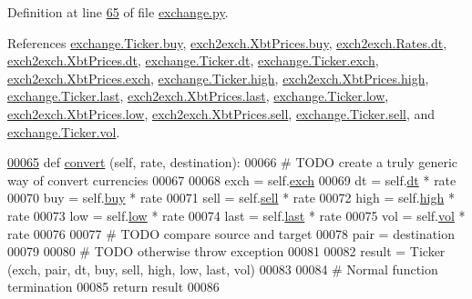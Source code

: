 Definition at line \hyperlink{exchange_8py_source_l00065}{65} of file \hyperlink{exchange_8py_source}{exchange.\+py}.



References \hyperlink{exchange_8py_source_l00058}{exchange.\+Ticker.\+buy}, \hyperlink{exch2exch_8py_source_l00059}{exch2exch.\+Xbt\+Prices.\+buy}, \hyperlink{exch2exch_8py_source_l00028}{exch2exch.\+Rates.\+dt}, \hyperlink{exch2exch_8py_source_l00057}{exch2exch.\+Xbt\+Prices.\+dt}, \hyperlink{exchange_8py_source_l00057}{exchange.\+Ticker.\+dt}, \hyperlink{exchange_8py_source_l00055}{exchange.\+Ticker.\+exch}, \hyperlink{exch2exch_8py_source_l00064}{exch2exch.\+Xbt\+Prices.\+exch}, \hyperlink{exchange_8py_source_l00060}{exchange.\+Ticker.\+high}, \hyperlink{exch2exch_8py_source_l00061}{exch2exch.\+Xbt\+Prices.\+high}, \hyperlink{exchange_8py_source_l00062}{exchange.\+Ticker.\+last}, \hyperlink{exch2exch_8py_source_l00063}{exch2exch.\+Xbt\+Prices.\+last}, \hyperlink{exchange_8py_source_l00061}{exchange.\+Ticker.\+low}, \hyperlink{exch2exch_8py_source_l00062}{exch2exch.\+Xbt\+Prices.\+low}, \hyperlink{exch2exch_8py_source_l00058}{exch2exch.\+Xbt\+Prices.\+sell}, \hyperlink{exchange_8py_source_l00059}{exchange.\+Ticker.\+sell}, and \hyperlink{exchange_8py_source_l00063}{exchange.\+Ticker.\+vol}.


\begin{DoxyCode}
\hypertarget{classexchange_1_1_ticker.tex_l00065}{}\hyperlink{classexchange_1_1_ticker_a2aa851437f953462f8e8bce7ca05c3ec}{00065}     \textcolor{keyword}{def }\hyperlink{classexchange_1_1_ticker_a2aa851437f953462f8e8bce7ca05c3ec}{convert} (self, rate, destination):
00066         \textcolor{comment}{# TODO create a truly generic way of convert currencies}
00067     
00068         exch = self.\hyperlink{classexchange_1_1_ticker_a33f33fe9a12da3ce52938afdc577c061}{exch}
00069         dt   = self.\hyperlink{classexchange_1_1_ticker_a45e3162d9956cee797f21d93c44c6baf}{dt}   * rate
00070         buy  = self.\hyperlink{classexchange_1_1_ticker_a2ca48c3fa9aba92241392a05bef39324}{buy}  * rate
00071         sell = self.\hyperlink{classexchange_1_1_ticker_a5ba9e257d2ed28f02528a37d9ebd793e}{sell} * rate
00072         high = self.\hyperlink{classexchange_1_1_ticker_aace381ca15468df6a40e8d86b7710a7f}{high} * rate
00073         low  = self.\hyperlink{classexchange_1_1_ticker_a1c1f26a47a82fc799fcebf158e104405}{low}  * rate
00074         last = self.\hyperlink{classexchange_1_1_ticker_add7c2d95fa790dcdffddae2e584ce5f5}{last} * rate
00075         vol  = self.\hyperlink{classexchange_1_1_ticker_a24c0dd396aebc54c06e429a68c964ea3}{vol}  * rate
00076 
00077         \textcolor{comment}{# TODO compare source and target}
00078         pair = destination
00079         
00080         \textcolor{comment}{# TODO otherwise throw exception }
00081         
00082         result = Ticker (exch, pair, dt, buy, sell, high, low, last, vol)
00083         
00084         \textcolor{comment}{# Normal function termination}
00085         \textcolor{keywordflow}{return} result 
00086         
\end{DoxyCode}
